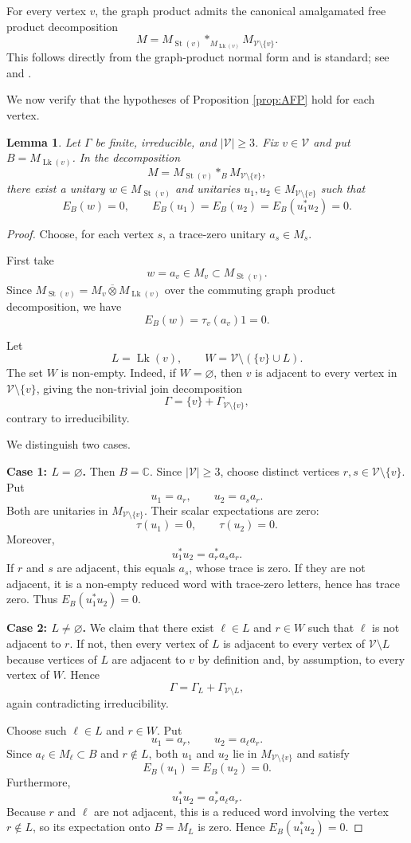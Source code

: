 \documentclass[11pt]{amsart}
\newtheorem{lemma}[theorem]{Lemma}
\theoremstyle{definition}
\newcommand{\V}{\mathcal V}
\newcommand{\Lk}{\operatorname{Lk}}
\newcommand{\St}{\operatorname{St}}
\newcommand{\C}{\mathbb C}
\newcommand{\bbarotimes}{\mathbin{\overline\otimes}}
\newcommand{\freeprod}{\mathop{*}}
\begin{document}
For every vertex $v$, the graph product admits the canonical amalgamated free product decomposition
\[
M
=
M_{\St(v)}
\freeprod_{M_{\Lk(v)}}
M_{\V\setminus\{v\}}.
\]
This follows directly from the graph-product normal form and is standard; see \cite{CF} and \cite[Section 1.1]{CDHJKEN}.

We now verify that the hypotheses of Proposition \ref{prop:AFP} hold for each vertex.

\begin{lemma}\label{lem:unitaries}
Let $\Gamma$ be finite, irreducible, and $|\V|\geq 3$.  Fix $v\in\V$ and put $B=M_{\Lk(v)}$.  In the decomposition
\[
M
=
M_{\St(v)}
\freeprod_B
M_{\V\setminus\{v\}},
\]
there exist a unitary $w\in M_{\St(v)}$ and unitaries $u_1,u_2\in M_{\V\setminus\{v\}}$ such that
\[
E_B(w)=0,\qquad
E_B(u_1)=E_B(u_2)=E_B(u_1^*u_2)=0.
\]
\end{lemma}

\begin{proof}
Choose, for each vertex $s$, a trace-zero unitary $a_s\in M_s$.

First take
\[
w=a_v\in M_v\subset M_{\St(v)}.
\]
Since $M_{\St(v)}=M_v\bbarotimes M_{\Lk(v)}$ over the commuting graph product decomposition, we have
\[
E_B(w)=\tau_v(a_v)1=0.
\]

Let
\[
L=\Lk(v),\qquad W=\V\setminus(\{v\}\cup L).
\]
The set $W$ is non-empty.  Indeed, if $W=\varnothing$, then $v$ is adjacent to every vertex in $\V\setminus\{v\}$, giving the non-trivial join decomposition
\[
\Gamma=\{v\}+\Gamma_{\V\setminus\{v\}},
\]
contrary to irreducibility.

We distinguish two cases.

\smallskip

\noindent\textbf{Case 1: $L=\varnothing$.}
Then $B=\C$.  Since $|\V|\geq 3$, choose distinct vertices $r,s\in \V\setminus\{v\}$.  Put
\[
u_1=a_r,\qquad u_2=a_s a_r.
\]
Both are unitaries in $M_{\V\setminus\{v\}}$.  Their scalar expectations are zero:
\[
\tau(u_1)=0,\qquad \tau(u_2)=0.
\]
Moreover,
\[
u_1^*u_2=a_r^*a_s a_r.
\]
If $r$ and $s$ are adjacent, this equals $a_s$, whose trace is zero.  If they are not adjacent, it is a non-empty reduced word with trace-zero letters, hence has trace zero.  Thus $E_B(u_1^*u_2)=0$.

\smallskip

\noindent\textbf{Case 2: $L\neq \varnothing$.}
We claim that there exist $\ell\in L$ and $r\in W$ such that $\ell$ is not adjacent to $r$.  If not, then every vertex of $L$ is adjacent to every vertex of $\V\setminus L$ because vertices of $L$ are adjacent to $v$ by definition and, by assumption, to every vertex of $W$.  Hence
\[
\Gamma=\Gamma_L+\Gamma_{\V\setminus L},
\]
again contradicting irreducibility.

Choose such $\ell\in L$ and $r\in W$.  Put
\[
u_1=a_r,\qquad u_2=a_\ell a_r.
\]
Since $a_\ell\in M_\ell\subset B$ and $r\notin L$, both $u_1$ and $u_2$ lie in $M_{\V\setminus\{v\}}$ and satisfy
\[
E_B(u_1)=E_B(u_2)=0.
\]
Furthermore,
\[
u_1^*u_2=a_r^*a_\ell a_r.
\]
Because $r$ and $\ell$ are not adjacent, this is a reduced word involving the vertex $r\notin L$, so its expectation onto $B=M_L$ is zero.  Hence $E_B(u_1^*u_2)=0$.
\end{proof}
\end{document}
